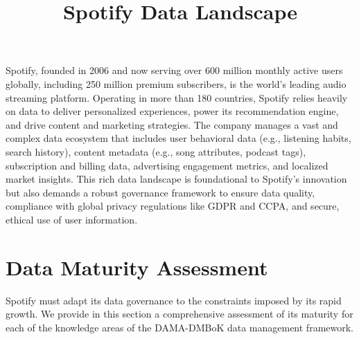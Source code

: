 \documentclass[11pt,a4paper,computermodern]{article}
\title{Spotify Data Landscape}
\date{}
\begin{document}
\maketitle

\vspace{-10mm}

Spotify, founded in 2006 and now serving over 600 million monthly active users globally, including 250 million premium subscribers, is the world’s leading audio streaming platform. Operating in more than 180 countries, Spotify relies heavily on data to deliver personalized experiences, power its recommendation engine, and drive content and marketing strategies. The company manages a vast and complex data ecosystem that includes user behavioral data (e.g., listening habits, search history), content metadata (e.g., song attributes, podcast tags), subscription and billing data, advertising engagement metrics, and localized market insights. This rich data landscape is foundational to Spotify’s innovation but also demands a robust governance framework to ensure data quality, compliance with global privacy regulations like GDPR and CCPA, and secure, ethical use of user information.


\section*{Data Maturity Assessment}

Spotify must adapt its data governance to the constraints imposed by its rapid growth. We provide in this section a comprehensive assessment of its maturity for each of the knowledge areas of the DAMA-DMBoK data management framework.
\end{document}
